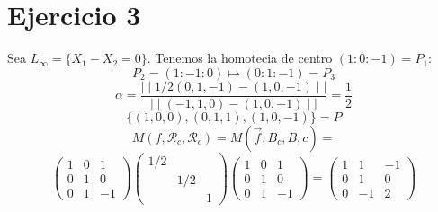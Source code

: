 \documentclass[10pt,a4paper,openright]{book}
\theoremstyle{break}
\begin{document}
\section{Ejercicio 3}%
\label{sec:ejercicio_3_3}
Sea $L_{\infty} = \{X_1 - X_2 = 0\}$. Tenemos la homotecia de centro $\left( 1 : 0 : -1 \right) = P_1$:
\[
P_2 = \left( 1 : -1 : 0 \right) \mapsto \left( 0 : 1 : -1 \right) = P_3
\]
\[
    \alpha = \frac{\mid \mid 1/2 \left( 0, 1, -1 \right) - \left( 1, 0, -1 \right) \mid \mid}{\mid \mid \left( -1, 1, 0 \right) - \left( 1, 0, -1 \right)\mid \mid} = \frac{1}{2} 
\]
\[
\{\left( 1, 0, 0 \right), \left( 0, 1, 1 \right), \left( 1, 0, -1 \right)\} = P
\]
\[
M\left( f, \mathcal{R}_c, \mathcal{R}_c \right) = M\left( \overrightarrow{f}, B_c, B,c \right) =
\]\[
\begin{pmatrix} 1 & 0 & 1\\ 0 & 1 & 0\\ 0 & 1 & -1 \end{pmatrix} \begin{pmatrix} 1/2 & & \\& 1/2 &\\ & & 1 \end{pmatrix} \begin{pmatrix} 1 & 0 & 1\\ 0 & 1 & 0\\ 0 & 1 & -1 \end{pmatrix} = \begin{pmatrix} 1 & 1 & -1\\ 0 & 1 & 0\\ 0 & -1 & 2 \end{pmatrix} 
\]
\end{document}
